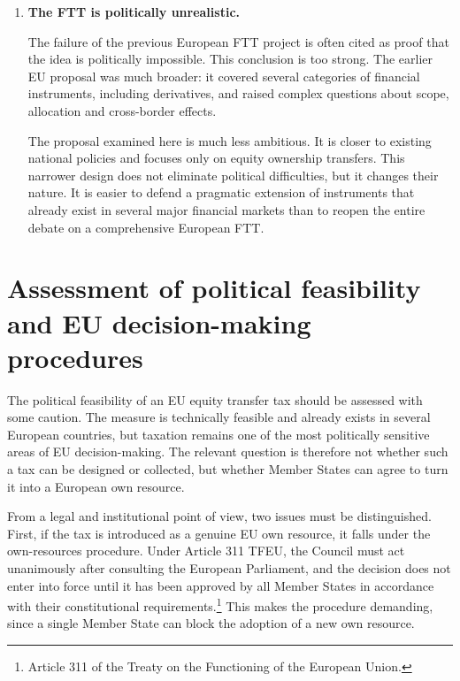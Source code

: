 \documentclass[../main]{subfiles}
\begin{document}
\begin{enumerate}
    As one component of a broader package, an equity transfer tax has several advantages: it is already tested, it can raise revenue from a large and highly internationalised tax base, it has a redistributive profile, and it is connected to an activity that is currently only lightly taxed relative to its scale. It is therefore a plausible and coherent own-resource candidate.

    \item \textbf{The FTT is politically unrealistic.}

    The failure of the previous European FTT project is often cited as proof that the idea is politically impossible. This conclusion is too strong. The earlier EU proposal was much broader: it covered several categories of financial instruments, including derivatives, and raised complex questions about scope, allocation and cross-border effects.

    The proposal examined here is much less ambitious. It is closer to existing national policies and focuses only on equity ownership transfers. This narrower design does not eliminate political difficulties, but it changes their nature. It is easier to defend a pragmatic extension of instruments that already exist in several major financial markets than to reopen the entire debate on a comprehensive European FTT.

\end{enumerate}


\section{Assessment of political feasibility and EU decision-making procedures}

The political feasibility of an EU equity transfer tax should be assessed with some caution. The measure is technically feasible and already exists in several European countries, but taxation remains one of the most politically sensitive areas of EU decision-making. The relevant question is therefore not whether such a tax can be designed or collected, but whether Member States can agree to turn it into a European own resource.

From a legal and institutional point of view, two issues must be distinguished. First, if the tax is introduced as a genuine EU own resource, it falls under the own-resources procedure. Under Article 311 TFEU, the Council must act unanimously after consulting the European Parliament, and the decision does not enter into force until it has been approved by all Member States in accordance with their constitutional requirements.\footnote{Article 311 of the Treaty on the Functioning of the European Union.} This makes the procedure demanding, since a single Member State can block the adoption of a new own resource.
\end{document}
